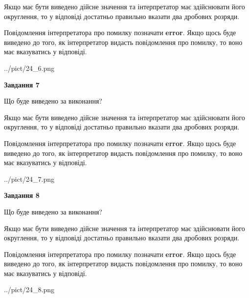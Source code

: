 \documentclass[12pt, ukrainian]{article}
\begin{document}
{\begin {Large}
Якщо має бути виведено дійсне значення та інтерпретатор має здійснювати його округлення, 
то у відповіді достатньо правильно вказати два дробових розряди.

Повідомлення інтерпретатора про помилку позначати \textbf{error}.
Якщо щось буде виведено до того, як інтерпретатор видасть повідомлення про помилку, 
то воно має вказуватись у відповіді. \par

\begin{center}
	{../pict/24_6.png}
\end{center}
\newpage

{\begin {center}\textbf{Завдання 7}\end {center}}\par
Що буде виведено за виконання? \par

Якщо має бути виведено дійсне значення та інтерпретатор має здійснювати його округлення, 
то у відповіді достатньо правильно вказати два дробових розряди.

Повідомлення інтерпретатора про помилку позначати \textbf{error}.
Якщо щось буде виведено до того, як інтерпретатор видасть повідомлення про помилку, 
то воно має вказуватись у відповіді. \par

\begin{center}
	{../pict/24_7.png}
\end{center}
\newpage

{\begin {center}\textbf{Завдання 8}\end {center}}\par
Що буде виведено за виконання? \par

Якщо має бути виведено дійсне значення та інтерпретатор має здійснювати його округлення, 
то у відповіді достатньо правильно вказати два дробових розряди.

Повідомлення інтерпретатора про помилку позначати \textbf{error}.
Якщо щось буде виведено до того, як інтерпретатор видасть повідомлення про помилку, 
то воно має вказуватись у відповіді. \par

\begin{center}
	{../pict/24_8.png}
\end{center}
\newpage


\end{Large}}
\end{document}
